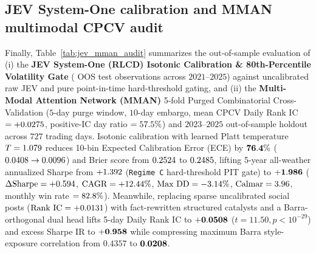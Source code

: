 \subsection{JEV System-One calibration and MMAN multimodal CPCV audit}
\label{app:jev_mman}
Finally, Table~\ref{tab:jev_mman_audit} summarizes the out-of-sample evaluation of (i) the
\textbf{JEV System-One (RLCD) Isotonic Calibration \& 80th-Percentile Volatility Gate}
(\JEVTestSamples{} OOS test observations across $2021\text{--}2025$) against uncalibrated raw JEV
and pure point-in-time hard-threshold gating, and (ii) the \textbf{Multi-Modal Attention Network
(MMAN)} 5-fold Purged Combinatorial Cross-Validation ($5$-day purge window, $10$-day embargo,
mean CPCV Daily Rank IC $= +0.0275{}$, positive-IC day ratio $= 57.5{}\%$)
and $2023\text{--}2025$ out-of-sample holdout across $727$ trading days. Isotonic calibration with learned
Platt temperature $T = 1.079{}$ reduces 10-bin Expected Calibration Error (ECE) by
$\mathbf{76.4{}\%}$ ($0.0408{} \to 0.0096{}$) and Brier score from
$0.2524{}$ to $0.2485{}$, lifting 5-year all-weather annualized Sharpe from
$+1.392{}$ (\texttt{Regime C} hard-threshold PIT gate) to $\mathbf{+1.986{}}$
($\Delta\text{Sharpe} = +0.594{}$, $\text{CAGR} = +12.44{}\%$,
$\text{Max DD} = -3.14{}\%$, $\text{Calmar} = 3.96{}$, monthly win rate
$= 82.8{}\%$). Meanwhile, replacing sparse uncalibrated social posts
($\text{Rank IC} = +0.0131{}$) with fact-rewritten structured catalysts and a
Barra-orthogonal dual head lifts 5-day Daily Rank IC to $\mathbf{+0.0508{}}$ ($t = 11.50,
p < 10^{-29}$) and excess Sharpe IR to $\mathbf{+0.958{}}$ while compressing maximum
Barra style-exposure correlation from $0.4357$ to $\mathbf{0.0208{}}$.

